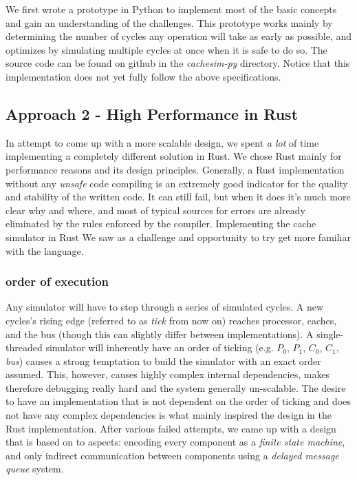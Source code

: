 \documentclass{article}
\begin{document}
\begin{multicols}{2}

We first wrote a prototype in Python to implement most of the basic concepts and gain an understanding of the challenges. This prototype works mainly by determining the number of cycles any operation will take as early as possible, and optimizes by simulating multiple cycles at once when it is safe to do so. The source code can be found on github in the \textit{cachesim-py} directory. Notice that this implementation does not yet fully follow the above specifications.

\subsection{Approach 2 - High Performance in Rust}

In attempt to come up with a more scalable design, we spent \textit{a lot} of time implementing a completely different solution in Rust. We chose Rust mainly for performance reasons and its design principles. Generally, a Rust implementation without any \textit{unsafe} code compiling is an extremely good indicator for the quality and stability of the written code. It can still fail, but when it does it's much more clear why and where, and most of typical sources for errors are already eliminated by the rules enforced by the compiler. Implementing the cache simulator in Rust We saw as a challenge and opportunity to try get more familiar with the language.

\subsubsection{order of execution}

Any simulator will have to step through a series of simulated cycles. A new cycles's rising edge (referred to as \textit{tick} from now on) reaches processor, caches, and the bus (though this can slightly differ between implementations). A single-threaded simulator will inherently have an order of ticking (e.g. $P_0$, $P_1$, $C_0$, $C_1$, \textit{bus}) causes a strong temptation to build the simulator with an exact order assumed. This, however, causes highly complex internal dependencies, makes therefore debugging really hard and the system generally un-scalable. The desire to have an implementation that is not dependent on the order of ticking and does not have any complex dependencies is what mainly inspired the design in the Rust implementation. After various failed attempts, we came up with a design that is based on to aspects: encoding every component as a \textit{finite state machine}, and only indirect communication between components using a \textit{delayed message queue} system.


\end{multicols}
\end{document}
